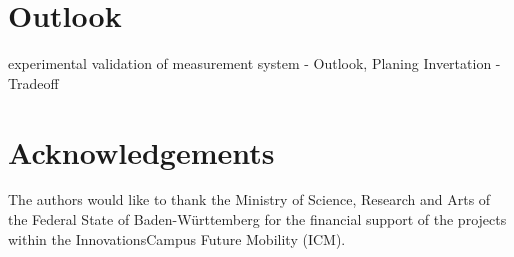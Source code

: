 \documentclass[5p,times,procedia]{elsarticle}
\begin{document}
\section{Outlook}
experimental validation of measurement system
- Outlook, Planing Invertation
- Tradeoff
%
%
\section*{Acknowledgements}
The authors would like to thank the Ministry of Science, Research and Arts of the Federal State of Baden-Württemberg for the financial support of the projects within the InnovationsCampus Future Mobility (ICM).
%


%
\clearpage\onecolumn
%
\normalMode
%
\end{document}
